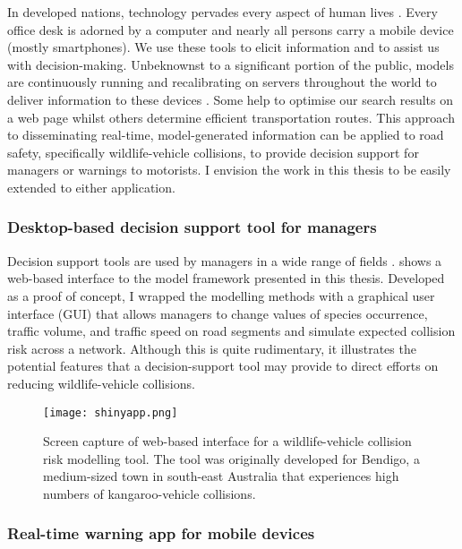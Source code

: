 In developed nations, technology pervades every aspect of human lives \citep{}. Every office desk is adorned by a computer and nearly all persons carry a mobile device (mostly smartphones). We use these tools to elicit information and to assist us with decision-making. Unbeknownst to a significant portion of the public, models are continuously running and recalibrating on servers throughout the world to deliver information to these devices \citep{}. Some help to optimise our search results on a web page whilst others determine efficient transportation routes. This approach to disseminating real-time, model-generated information can be applied to road safety, specifically wildlife-vehicle collisions, to provide decision support for managers or warnings to motorists. I envision the work in this thesis to be easily extended to either application.

\subsubsection{Desktop-based decision support tool for managers}

Decision support tools are used by managers in a wide range of fields \citep{}.  shows a web-based interface to the model framework presented in this thesis. Developed as a proof of concept, I wrapped the modelling methods with a graphical user interface (GUI) that allows managers to change values of species occurrence, traffic volume, and traffic speed on road segments and simulate expected collision risk across a network. Although this is quite rudimentary, it illustrates the potential features that a decision-support tool may provide to direct efforts on reducing wildlife-vehicle collisions.

\begin{figure*}[htp]
  \centering
  \texttt{[image: shinyapp.png]}
  \caption[Decision support tool for wildlife-vehicle collisions]{Screen capture of web-based interface for a wildlife-vehicle collision risk modelling tool. The tool was originally developed for Bendigo, a medium-sized town in south-east Australia that experiences high numbers of kangaroo-vehicle collisions.}
  \label{wvc_tool}
\end{figure*}

\subsubsection{Real-time warning app for mobile devices}

